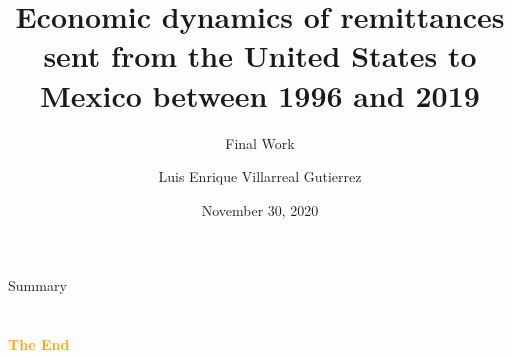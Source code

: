\documentclass[aspectratio=43]{beamer}
\title{Economic dynamics of remittances sent from the United States to Mexico between 1996 and 2019}
\subtitle{Final Work}
\author[L. Villarreal]{Luis Enrique Villarreal Gutierrez}
\institute[UDG]{
    Centro Universitario de Ciencias Económico-Administrativas%
    \\%
    Universidad de Guadalajara%
}
\date{November 30, 2020}
\begin{document}
    
    \frame{\titlepage}
    
    \begin{frame}{Summary}
        \tableofcontents
    \end{frame}
    
    
    
    
    
    
    

    \section{}
    \begin{frame}{}
        \centering
            \Huge\bfseries
        \textcolor{orange}{The End}
    \end{frame}
\end{document}
